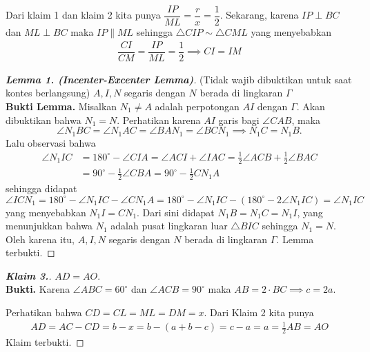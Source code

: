     \newpage
    
    Dari klaim 1 dan klaim 2 kita punya $\dfrac{IP}{ML} = \dfrac{r}{x} = \dfrac{1}{2}$. Sekarang, karena $IP \perp BC$ dan $ML \perp BC$ maka $IP \parallel ML$ sehingga $\triangle CIP \sim \triangle CML$ yang menyebabkan
    \begin{align*}
        \dfrac{CI}{CM} = \dfrac{IP}{ML} = \dfrac{1}{2} \implies CI = IM
    \end{align*}

    \hrulefill
    \begin{proof}[\textbf{Lemma 1. (Incenter-Excenter Lemma)}] (Tidak wajib dibuktikan untuk saat kontes berlangsung) $A,I,N$ segaris dengan $N$ berada di lingkaran $\Gamma$\\
        \textbf{Bukti Lemma.} Misalkan $N_1 \neq A$ adalah perpotongan $AI$ dengan $\Gamma$. Akan dibuktikan bahwa $N_1 = N$. 
        Perhatikan karena $AI$ garis bagi $\angle CAB$, maka $$\angle N_1BC = \angle N_1AC = \angle BAN_1 = \angle BCN_1 \implies N_1C=N_1B.$$ 
        Lalu observasi bahwa
        \begin{align*}
            \angle N_1IC &= 180^\circ - \angle CIA = \angle ACI + \angle IAC = \frac{1}{2}\angle ACB + \frac{1}{2}\angle BAC\\ &= 90^\circ - \frac{1}{2}\angle CBA = 90^\circ - \frac{1}{2} CN_1A
        \end{align*}
        sehingga didapat
        $$\angle ICN_1 = 180^\circ - \angle N_1IC - \angle CN_1A = 180^\circ - \angle N_1IC - (180^\circ - 2\angle N_1IC) = \angle N_1IC$$
        yang menyebabkan $N_1I=CN_1$. Dari sini didapat $N_1B=N_1C=N_1I$, yang menunjukkan bahwa $N_1$ adalah pusat lingkaran luar $\triangle BIC$ sehingga $N_1 = N$. Oleh karena itu, $A,I,N$ segaris dengan $N$ berada di lingkaran $\Gamma$. Lemma terbukti.
    \end{proof}
    \newpage

    \begin{proof}[\textbf{Klaim 3.}] $AD=AO$.\\
        \textbf{Bukti.} Karena $\angle ABC = 60^\circ$ dan $\angle ACB = 90^\circ$ maka $AB = 2\cdot BC \implies c = 2a$.

        Perhatikan bahwa $CD = CL = ML = DM = x$. Dari Klaim 2 kita punya
        \begin{align*}
            AD = AC - CD = b - x = b - (a+b-c) = c - a = a = \frac{1}{2}AB = AO
        \end{align*}
        Klaim terbukti.
    \end{proof}
    \hrulefill

